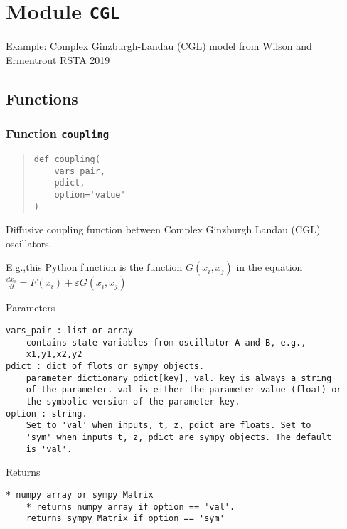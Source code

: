 \documentclass[
  english,
  a4paper,
  oneside]{article}
\begin{document}
\hypertarget{CGL}{%
\section{\texorpdfstring{Module \texttt{CGL}}{Module CGL}}\label{CGL}}

Example: Complex Ginzburgh-Landau (CGL) model from Wilson and Ermentrout
RSTA 2019

\hypertarget{functions-2}{%
\subsection{Functions}\label{functions-2}}

\hypertarget{CGL.coupling}{%
\subsubsection{\texorpdfstring{Function
\texttt{coupling}}{Function coupling}}\label{CGL.coupling}}

\begin{quote}
\begin{verbatim}
def coupling(
    vars_pair,
    pdict,
    option='value'
)
\end{verbatim}
\end{quote}

Diffusive coupling function between Complex Ginzburgh Landau (CGL)
oscillators.

E.g.,this Python function is the function \(G(x_i,x_j)\) in the equation
\(\frac{dx_i}{dt} = F(x_i) + \varepsilon G(x_i,x_j)\)

Parameters

\begin{verbatim}
vars_pair : list or array
    contains state variables from oscillator A and B, e.g.,
    x1,y1,x2,y2
pdict : dict of flots or sympy objects.
    parameter dictionary pdict[key], val. key is always a string
    of the parameter. val is either the parameter value (float) or 
    the symbolic version of the parameter key.
option : string.
    Set to 'val' when inputs, t, z, pdict are floats. Set to
    'sym' when inputs t, z, pdict are sympy objects. The default
    is 'val'.
\end{verbatim}

Returns

\begin{verbatim}
* numpy array or sympy Matrix
    * returns numpy array if option == 'val'. 
    returns sympy Matrix if option == 'sym'
\end{verbatim}
\end{document}
